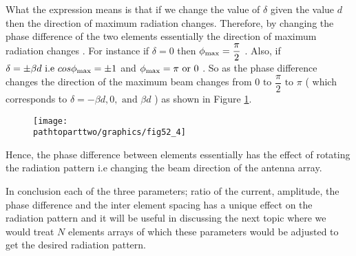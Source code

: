 What the expression means is that if we change the value of $\delta $ given the value $d $ then the direction of maximum radiation changes. Therefore, by changing the phase difference of the two elements essentially the direction of maximum radiation changes . For instance if $ \delta = 0 $ then $ \phi_{\textnormal{max}} = \dfrac{ \pi }{ 2 } $ . Also, if $ \delta = \pm \beta d \text{ i.e } cos\phi_{\textnormal{max}} = \pm 1 $ and $ \phi_{\textnormal{max}} = \pi \text{ or } 0 $ . So as the phase difference changes the direction of the maximum beam changes from $ 0 \text{ to } \dfrac{ \pi }{ 2 } \text{ to } \pi $ ( which corresponds to $ \delta = - \beta d , 0 , \text{ and } \beta d $ ) as shown in Figure \ref{52.4}.
\begin{figure}[h]
\centering
\texttt{[image: \\pathtoparttwo/graphics/fig52\_4]}
\caption{}
\label{52.4}
\end{figure}

Hence, the phase difference between elements essentially has the effect of rotating the radiation pattern i.e changing the beam direction of the antenna array.

In conclusion each of the three parameters; ratio of the  current, amplitude, the phase difference and the inter element spacing has a unique effect on the radiation pattern and it will be useful in discussing the next topic where we would treat $ N $ elements arrays of which these parameters would be adjusted to get the desired radiation pattern.